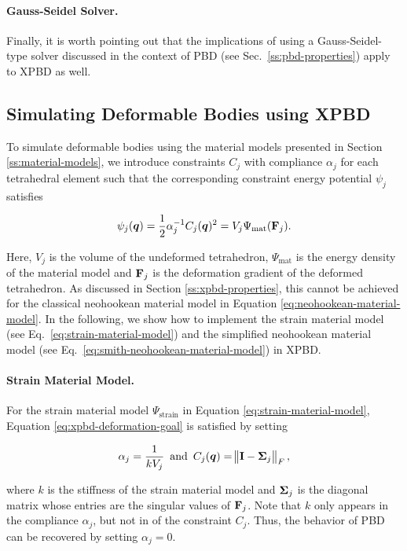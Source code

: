 \paragraph{Gauss-Seidel Solver.}
Finally, it is worth pointing out that the implications of using a Gauss-Seidel-type solver discussed in the context of PBD 
(see Sec.\ \ref{ss:pbd-properties}) apply to XPBD as well.

\subsection{Simulating Deformable Bodies using XPBD}\label{ss:xpbd-deformable-bodies}
To simulate deformable bodies using the material models presented in Section \ref{ss:material-models}, we introduce constraints $C_j$ with 
compliance $\alpha_j$ for each tetrahedral element such that the corresponding constraint energy 
potential $\psi_j$ satisfies

\begin{equation}\label{eq:xpbd-deformation-goal}
    \psi_j(\bm{q}) = \frac{1}{2}\alpha^{-1}_jC_j(\bm{q})^2 = V_j\Psi_{\text{mat}}(\mathbf{F}_j).
\end{equation}

\noindent Here, $V_j$ is the volume of the undeformed tetrahedron, $\Psi_{\text{mat}}$ is the energy density of the material 
model and $\mathbf{F}_j$ is the deformation gradient of the deformed tetrahedron. As discussed in Section \ref{ss:xpbd-properties}, this 
cannot be achieved for the classical neohookean material model in Equation \ref{eq:neohookean-material-model}. In the following, we show 
how to implement the strain material model (see Eq.\ \ref{eq:strain-material-model}) and the simplified neohookean material model 
(see Eq.\ \ref{eq:smith-neohookean-material-model}) in XPBD.

\paragraph{Strain Material Model.}
For the strain material model $\Psi_{\text{strain}}$ in Equation \ref{eq:strain-material-model}, Equation \ref{eq:xpbd-deformation-goal} is 
satisfied by setting 

\[
    \alpha_j = \frac{1}{k V_j} \, \, \, \text{and} \, \, \, C_j(\bm{q}) = \norm{\mathbf{I} - \mathbf{\Sigma}_j}_F,
\]

\noindent where $k$ is the stiffness of the strain material model and $\mathbf{\Sigma}_j$ is the diagonal matrix whose entries 
are the singular values of $\mathbf{F}_j$. Note that $k$ only appears in the compliance $\alpha_j$, but not in of the constraint 
$C_j$. Thus, the behavior of PBD can be recovered by setting $\alpha_j = 0$.

